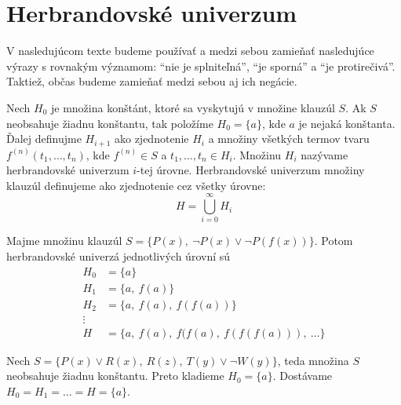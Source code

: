 \section{Herbrandovské univerzum}

\begin{poznamka}
    V nasledujúcom texte budeme používať a medzi sebou zamieňať
    nasledujúce výrazy s rovnakým významom:
    ``nie je splniteľná'', 
    ``je sporná'' a
    ``je protirečivá''. Taktiež, občas budeme zamieňať medzi sebou
    aj ich negácie.
\end{poznamka}

\begin{definicia}
    Nech $H_0$ je množina konštánt, ktoré sa vyskytujú v množine
    klauzúl $S$.
    Ak $S$ neobsahuje žiadnu konštantu, tak položíme $H_0=\{ a \}$,
    kde $a$ je nejaká konštanta.
    Ďalej definujme $H_{i+1}$ ako zjednotenie $H_{i}$ a množiny všetkých termov
    tvaru $f^{(n)}(t_1,\dots, t_n)$, kde $f^{(n)} \in S$ a
    $t_1, \dots, t_n \in H_i$.
    Množinu $H_i$ nazývame
    {\rm herbrandovské univerzum $i$-tej úrovne}.
    Herbrandovské univerzum množiny klauzúl definujeme ako zjednotenie
    cez všetky úrovne:
    \begin{equation*}
        H=\bigcup_{i=0}^{\infty} H_i
    \end{equation*}
\end{definicia}

\begin{priklad}
    Majme množinu klauzúl
    $S= \{ P(x),\ \neg P(x) \lor \neg P(f(x))\}$.
    Potom herbrandovské univerzá jednotlivých úrovní sú
    \begin{align*}
        H_0& = \{ a \} \\
        H_1& = \{ a,\ f(a) \} \\
        H_2& = \{ a,\ f(a),\ f(f(a)) \} \\
         \vdots\ \ &\\
        H_{\phantom{0}} &= \{ a,\ f(a),\ f(f(a),\ f(f(f(a))),\ \ldots \}
    \end{align*}
\end{priklad}

\begin{priklad}
    Nech $S=\{P(x) \lor R(x),\ R(z),\ T(y) \lor \neg W(y) \}$, teda
    množina $S$ neobsahuje žiadnu konštantu.
    Preto kladieme $H_0 = \{ a \}$. Dostávame
    $H_0=H_1=\dots=H=\{a\}$.
\end{priklad}

